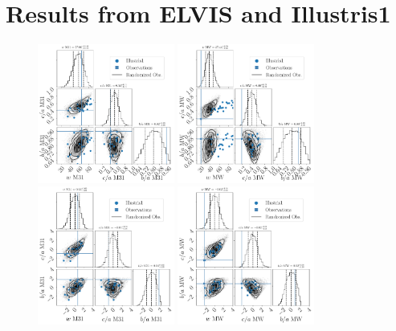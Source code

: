 \documentclass[a4paper,fleqn,usenatbib]{mnras}
\begin{document}
\section{Results from ELVIS and Illustris1}
\label{appendix:plots}
\begin{figure}
\centering
\includegraphics[width=0.40\textwidth]{input_illustris1_obs_M31_n_11.pdf}
\includegraphics[width=0.40\textwidth]{input_illustris1_obs_MW_n_11.pdf}
\includegraphics[width=0.40\textwidth]{input_illustris1_obs_M31_n_11_normed.pdf}
\includegraphics[width=0.40\textwidth]{input_illustris1_obs_MW_n_11_normed.pdf}

\end{figure}
\end{document}
